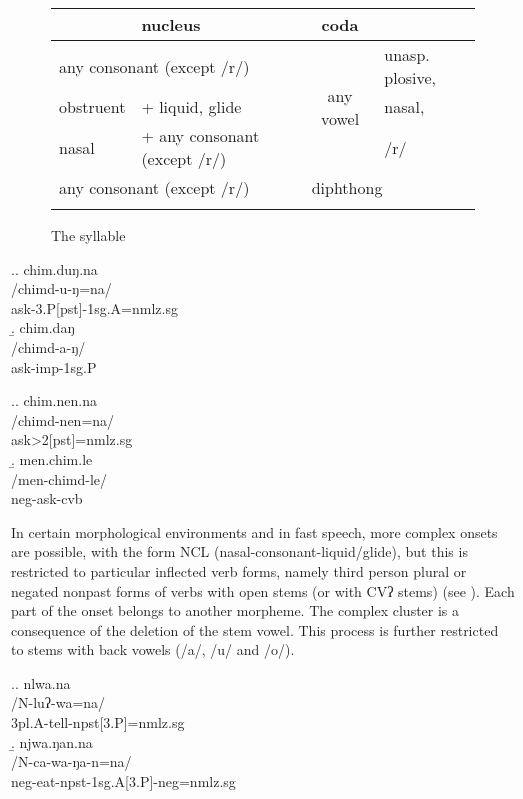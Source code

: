  \begin{figure}[htp]	
 \begin{center}		
\begin{tabular}{ll|c|l}
\lsptoprule
\multicolumn{2}{l|}{{\sc onset}}&\multicolumn{1}{l|}{\sc nucleus}&{\sc coda}\\
\hline
\multicolumn{2}{l|}{any consonant (except /r/)}& \multirow{3}{*}{any vowel} & unasp. plosive,\\
\cline{1-2}
obstruent&+ liquid, glide & & nasal,\\
\cline{1-2}
nasal&+ any consonant (except /r/)& & /r/\\
\hline
\multicolumn{2}{l|}{any consonant (except /r/)}&\multicolumn{2}{l}{diphthong}\\
\lspbottomrule
\end{tabular}
\caption{The syllable}\label{syll}
\end{center}
\end{figure}


\ex.\a. \glll chim.duŋ.na\\
/chimd-u-ŋ=na/\\
ask{\sc -3.P[pst]-1sg.A=nmlz.sg}\\
\b. \glll chim.daŋ\\
/chimd-a-ŋ/\\
ask{\sc -imp-1sg.P}\\

\ex.\a. \glll chim.nen.na\\
/chimd-nen=na/\\
ask{>2[pst]=nmlz.sg}\\
\b. \glll men.chim.le\\
/men-chimd-le/\\
{\sc neg-}ask{\sc -cvb}\\

\newpage
In certain morphological environments and in fast speech, more complex onsets are possible, with the form NCL (nasal-consonant-liquid/glide), but this is restricted to particular inflected verb forms, namely third person plural or negated nonpast forms of verbs with open stems (or with CVʔ stems) (see \Next). Each part of the onset belongs to another morpheme. The complex cluster is a consequence of the deletion of the stem vowel. This process is further restricted to stems with back vowels (/a/, /u/ and /o/). 



\ex.\a. \glll nlwa.na\\
/N-luʔ-wa=na/\\
{\sc 3pl.A-}tell{\sc -npst[3.P]=nmlz.sg}\\
\b. \glll njwa.ŋan.na\\
/N-ca-wa-ŋa-n=na/\\
{\sc neg-}eat{\sc -npst-1sg.A[3.P]-neg=nmlz.sg}\\



